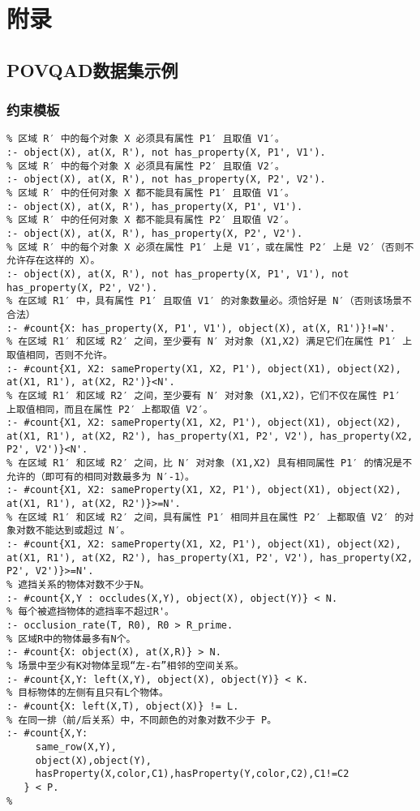 \chapter{附录}
\section{POVQAD数据集示例}
\subsection{约束模板}
\label{appendix:constraints}
\begin{lstlisting}
% 区域 R′ 中的每个对象 X 必须具有属性 P1′ 且取值 V1′。
:- object(X), at(X, R'), not has_property(X, P1', V1'). 
% 区域 R′ 中的每个对象 X 必须具有属性 P2′ 且取值 V2′。
:- object(X), at(X, R'), not has_property(X, P2', V2').
% 区域 R′ 中的任何对象 X 都不能具有属性 P1′ 且取值 V1′。
:- object(X), at(X, R'), has_property(X, P1', V1'). 
% 区域 R′ 中的任何对象 X 都不能具有属性 P2′ 且取值 V2′。
:- object(X), at(X, R'), has_property(X, P2', V2').
% 区域 R′ 中的每个对象 X 必须在属性 P1′ 上是 V1′，或在属性 P2′ 上是 V2′（否则不允许存在这样的 X）。
:- object(X), at(X, R'), not has_property(X, P1', V1'), not has_property(X, P2', V2').
% 在区域 R1′ 中，具有属性 P1′ 且取值 V1′ 的对象数量必。须恰好是 N′（否则该场景不合法）
:- #count{X: has_property(X, P1', V1'), object(X), at(X, R1')}!=N'.
% 在区域 R1′ 和区域 R2′ 之间，至少要有 N′ 对对象 (X1,X2) 满足它们在属性 P1′ 上取值相同，否则不允许。
:- #count{X1, X2: sameProperty(X1, X2, P1'), object(X1), object(X2), at(X1, R1'), at(X2, R2')}<N'.
% 在区域 R1′ 和区域 R2′ 之间，至少要有 N′ 对对象 (X1,X2)，它们不仅在属性 P1′ 上取值相同，而且在属性 P2′ 上都取值 V2′。
:- #count{X1, X2: sameProperty(X1, X2, P1'), object(X1), object(X2), at(X1, R1'), at(X2, R2'), has_property(X1, P2', V2'), has_property(X2, P2', V2')}<N'.
% 在区域 R1′ 和区域 R2′ 之间，比 N′ 对对象 (X1,X2) 具有相同属性 P1′ 的情况是不允许的（即可有的相同对数最多为 N′-1）。
:- #count{X1, X2: sameProperty(X1, X2, P1'), object(X1), object(X2), at(X1, R1'), at(X2, R2')}>=N'.
% 在区域 R1′ 和区域 R2′ 之间，具有属性 P1′ 相同并且在属性 P2′ 上都取值 V2′ 的对象对数不能达到或超过 N′。
:- #count{X1, X2: sameProperty(X1, X2, P1'), object(X1), object(X2), at(X1, R1'), at(X2, R2'), has_property(X1, P2', V2'), has_property(X2, P2', V2')}>=N'.
% 遮挡关系的物体对数不少于N。
:- #count{X,Y : occludes(X,Y), object(X), object(Y)} < N.
% 每个被遮挡物体的遮挡率不超过R'。
:- occlusion_rate(T, R0), R0 > R_prime.
% 区域R中的物体最多有N个。
:- #count{X: object(X), at(X,R)} > N.
% 场景中至少有K对物体呈现“左-右”相邻的空间关系。
:- #count{X,Y: left(X,Y), object(X), object(Y)} < K.
% 目标物体的左侧有且只有L个物体。
:- #count{X: left(X,T), object(X)} != L.
% 在同一排（前/后关系）中，不同颜色的对象对数不少于 P。
:- #count{X,Y:
     same_row(X,Y),
     object(X),object(Y),
     hasProperty(X,color,C1),hasProperty(Y,color,C2),C1!=C2
   } < P.
% 
\end{lstlisting}
